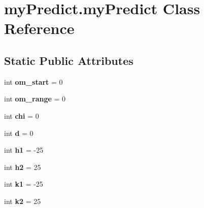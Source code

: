 \hypertarget{classmyPredict_1_1myPredict}{\section{my\-Predict.\-my\-Predict Class Reference}
\label{classmyPredict_1_1myPredict}
}
\subsection*{Static Public Attributes}
\begin{DoxyCompactItemize}
\item 
\hypertarget{classmyPredict_1_1myPredict_a22120f9618f06acd8650c15c08825c80}{int {\bfseries om\-\_\-start} = 0}\label{classmyPredict_1_1myPredict_a22120f9618f06acd8650c15c08825c80}

\item 
\hypertarget{classmyPredict_1_1myPredict_a4b21c39ba945630d9b575427e578ca96}{int {\bfseries om\-\_\-range} = 0}\label{classmyPredict_1_1myPredict_a4b21c39ba945630d9b575427e578ca96}

\item 
\hypertarget{classmyPredict_1_1myPredict_a628dfab0d8a8cd900af38f69d58ea96a}{int {\bfseries chi} = 0}\label{classmyPredict_1_1myPredict_a628dfab0d8a8cd900af38f69d58ea96a}

\item 
\hypertarget{classmyPredict_1_1myPredict_ad000055f5486abf5e3ad766e1170775f}{int {\bfseries d} = 0}\label{classmyPredict_1_1myPredict_ad000055f5486abf5e3ad766e1170775f}

\item 
\hypertarget{classmyPredict_1_1myPredict_abf3a46e4bd94b6d14263dacd22c9cb24}{int {\bfseries h1} = -\/25}\label{classmyPredict_1_1myPredict_abf3a46e4bd94b6d14263dacd22c9cb24}

\item 
\hypertarget{classmyPredict_1_1myPredict_a1193984f0a6fde8ddbca73c1c027294a}{int {\bfseries h2} = 25}\label{classmyPredict_1_1myPredict_a1193984f0a6fde8ddbca73c1c027294a}

\item 
\hypertarget{classmyPredict_1_1myPredict_a36f7425581e5d92e7ae40a14c731cc9c}{int {\bfseries k1} = -\/25}\label{classmyPredict_1_1myPredict_a36f7425581e5d92e7ae40a14c731cc9c}

\item 
\hypertarget{classmyPredict_1_1myPredict_a25decbee9aa99c6106854776fdeca4bb}{int {\bfseries k2} = 25}\label{classmyPredict_1_1myPredict_a25decbee9aa99c6106854776fdeca4bb}


\end{DoxyCompactItemize}
